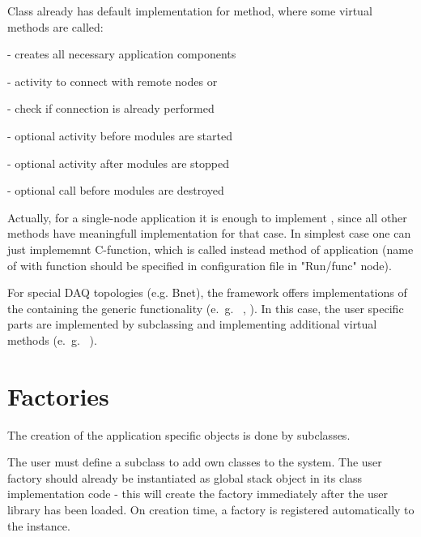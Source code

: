 Class  already has default implementation for
 method, where some virtual methods are called:

\bdes
\item[\func{CreateAppModules()}] - creates all necessary application components
\item[\func{ConnectAppModules()}] - activity to connect with remote nodes or  
\item[\func{IsAppModulesConnected()}] - check if connection is already performed  
\item[\func{BeforeAppModulesStarted()}] - optional activity before modules are started 
\item[\func{AfterAppModulesStopped()}] - optional activity after modules are stopped
\item[\func{BeforeAppModulesDestroyed()}] - optional call before modules are destroyed
\edes

Actually, for a single-node application it is enough to implement ,
since all other methods have meaningfull implementation for that case. 
In simplest case one can just implememnt C-function, which is called instead 
method of application (name of with function should be specified in configuration file
in "Run/func" node).

For special DAQ topologies (e.g. Bnet), the framework offers 
implementations of the  containing the 
generic functionality (e.~g.~ , ). 
In this case, the user specific parts are implemented by subclassing 
and implementing additional virtual methods (e.~g.~ ).    



\section{Factories}
\label{prog_plugin_factory}

The creation of the application specific objects is done by  subclasses.

The user must define a  
subclass to add own classes to the system.
The user factory should already be instantiated as global stack object
in its class implementation code -
this will create  the factory immediately after the user library has been loaded. 
On creation time, a factory is registered automatically to the  
instance.

